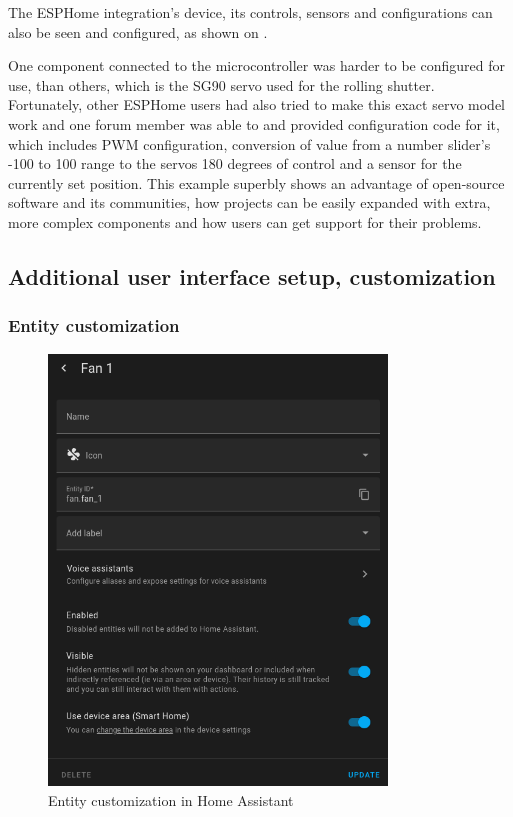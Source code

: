 The ESPHome integration's device, its controls, sensors and configurations can also be seen and configured, as shown on .

One component connected to the microcontroller was harder to be configured for use, than others, which is the SG90 servo used for the rolling shutter. Fortunately, other ESPHome users had also tried to make this exact servo model work and one forum member was able to and provided configuration code for it, which includes PWM configuration, conversion of value from a number slider's -100 to 100 range to the servos 180 degrees of control and a sensor for the currently set position. \cite{ESPHomeForumSG90} This example superbly shows an advantage of open-source software and its communities, how projects can be easily expanded with extra, more complex components and how users can get support for their problems.

\subsection{Additional user interface setup, customization}

\subsubsection{Entity customization}

\begin{figure}[!ht]
  \centering
  \includegraphics[width=90mm, keepaspectratio]{figures/homeassistant_entity_customization.png}
  \caption{Entity customization in Home Assistant}
  \label{fig:HAentityCustomization}
\end{figure}

